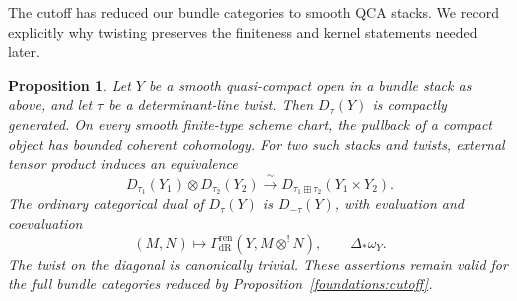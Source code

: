 \documentclass[11pt]{article}
\numberwithin{equation}{section}
\newtheorem{proposition}[theorem]{Proposition}
\theoremstyle{definition}
\theoremstyle{remark}
\begin{document}
The cutoff has reduced our bundle categories to smooth QCA stacks.
We record explicitly why twisting preserves the finiteness and kernel
statements needed later.

\begin{proposition}\label{foundations:categories}
Let $Y$ be a smooth quasi-compact open in a bundle stack as above, and
let $\tau$ be a determinant-line twist.  Then $D_\tau(Y)$ is compactly
generated.  On every smooth finite-type scheme chart, the pullback of a
compact object has bounded coherent cohomology.  For two such
stacks and twists, external tensor product induces an equivalence
\begin{equation}\label{foundations:kunneth}
 D_{\tau_1}(Y_1)\otimes D_{\tau_2}(Y_2)
 \xrightarrow{\ \sim\ }
 D_{\tau_1\boxplus\tau_2}(Y_1\times Y_2).
\end{equation}
The ordinary categorical dual of $D_\tau(Y)$ is $D_{-\tau}(Y)$, with
evaluation and coevaluation
\begin{equation}\label{foundations:evaluation}
 (M,N)\longmapsto
 \Gamma_{\mathrm{dR}}^{\mathrm{ren}}(Y,M\otimes^!N),
 \qquad \Delta_*\omega_Y.
\end{equation}
The twist on the diagonal is canonically trivial.  These assertions
remain valid for the full bundle categories reduced by
Proposition~\ref{foundations:cutoff}.
\end{proposition}
\end{document}
